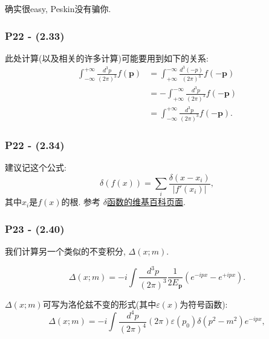 \documentclass[cn,hazy,blue,11pt,device=normal,chinesefont=founder]{elegantnote}
\begin{document}
\begin{remark}
  确实很easy, Peskin没有骗你. 
\end{remark}

\subsubsection{P22 - (2.33)}

此处计算(以及相关的许多计算)可能要用到如下的关系: 
\begin{equation}
  \begin{aligned}
  \int_{-\infty}^{+\infty}\frac{d^3 p}{(2\pi)^3}f(\mathbf p) &= \int_{+\infty}^{-\infty}\frac{d^3 (-p)}{(2\pi)^3}f(-\mathbf p) \\
  &= -\int_{+\infty}^{-\infty}\frac{d^3 p}{(2\pi)^3}f(-\mathbf p) \\
  &= \int_{-\infty}^{+\infty}\frac{d^3 p}{(2\pi)^3}f(-\mathbf p).
  \end{aligned}
\end{equation}

\subsubsection{P22 - (2.34)}

建议记这个公式: 
\begin{equation}
  \delta(f(x)) = \sum_i \frac{\delta(x-x_i)}{|f'(x_i)|}, 
\end{equation}
其中$x_i$是$f(x)$的根. 参考 \href{https://zh.wikipedia.org/wiki/狄拉克δ函数#與函數的復合}{$\delta$函数的维基百科页面}. 

\subsubsection{P23 - (2.40)} \label{subsubsec: Invar_Delta}

我们计算另一个类似的不变积分, $\Delta(x; m)$. 

\begin{definition}
  \begin{equation}
    \Delta(x; m) = -i\int\frac{d^3 p}{(2\pi)^3} \frac{1}{2E_\mathbf{p}}(e^{-ipx} - e^{+ipx}). 
  \end{equation}
\end{definition}

$\Delta(x; m)$可写为洛伦兹不变的形式(其中$\varepsilon(x)$为符号函数): 
\begin{equation}
  \Delta(x; m) = -i\int \frac{d^4 p}{(2\pi)^4}(2\pi)\varepsilon(p_0) \delta(p^2 - m^2)e^{-ipx}, 
\end{equation}
\end{document}
